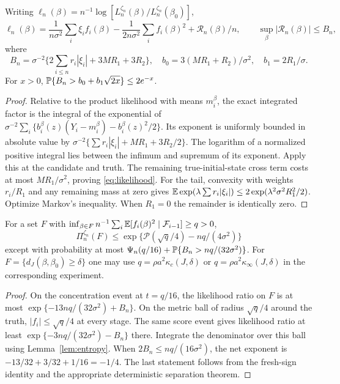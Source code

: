 \begin{lemma}
\label{lem:remainder}
Writing $\ell_n(\beta)=n^{-1}\log[L_n^{\zeta_n}(\beta)/L_n^{\zeta_n}(\beta_0)]$,
\begin{equation}
 \ell_n(\beta)=\frac1{n\sigma^2}\sum_i\xi_i f_i(\beta)
 -\frac1{2n\sigma^2}\sum_i f_i(\beta)^2+\mathcal R_n(\beta)/n,
 \qquad \sup_\beta|\mathcal R_n(\beta)|\le B_n,
 \label{eq:likelihood}
\end{equation}
where
\[
 B_n=\sigma^{-2}\{2\sum_{i\le n}r_i|\xi_i|+3MR_1+3R_2\},\quad
 b_0=3(MR_1+R_2)/\sigma^2,\quad b_1=2R_1/\sigma.
\]
For $x>0$, $\mathbb P\{B_n>b_0+b_1\sqrt{2x}\}\le2e^{-x}$.
\end{lemma}
\begin{proof}
Relative to the product likelihood with means $m_i^\beta$, the exact
integrated factor is the integral of the exponential of
$\sigma^{-2}\sum_i\{b_i^\beta(z)(Y_i-m_i^\beta)-b_i^\beta(z)^2/2\}$.
Its exponent is uniformly bounded in absolute value by
$\sigma^{-2}\{\sum r_i|\xi_i|+MR_1+3R_2/2\}$. The logarithm of a normalized
positive integral lies between the infimum and supremum of its exponent.
Apply this at the candidate and truth. The remaining true-initial-state cross
term costs at most $MR_1/\sigma^2$, proving \eqref{eq:likelihood}.
For the tail, convexity with weights $r_i/R_1$ and any remaining mass at zero
gives $\mathbb E\exp(\lambda\sum r_i|\xi_i|)\le
2\exp(\lambda^2\sigma^2R_1^2/2)$. Optimize Markov's inequality.
When $R_1=0$ the remainder is identically zero.
\end{proof}

\begin{theorem}
\label{thm:posterior}
For a set $F$ with
$\inf_{\beta\in F}n^{-1}\sum_i\mathbb E[f_i(\beta)^2\mid\mathcal F_{i-1}]\ge q>0$,
\begin{equation}
 \Pi_n^{\zeta_n}(F)\le
 \exp\{\mathcal P(\sqrt q/4)-nq/(4\sigma^2)\}
 \label{eq:posterior-bound}
\end{equation}
except with probability at most
$\Psi_n(q/16)+\mathbb P\{B_n>nq/(32\sigma^2)\}$.
For $F=\{d_J(\beta,\beta_0)\ge\delta\}$ one may use
$q=\rho a^2\kappa_c(J,\delta)$ or $q=\rho a^2\kappa_\infty(J,\delta)$
in the corresponding experiment.
\end{theorem}
\begin{proof}
On the concentration event at $t=q/16$, the likelihood ratio on $F$ is at most
$\exp\{-13nq/(32\sigma^2)+B_n\}$. On the metric ball of radius $\sqrt q/4$
around the truth, $|f_i|\le\sqrt q/4$ at every stage. The same score event
gives likelihood ratio at least $\exp\{-3nq/(32\sigma^2)-B_n\}$ there.
Integrate the denominator over this ball using Lemma~\ref{lem:entropy}.
When $2B_n\le nq/(16\sigma^2)$, the net exponent is
$-13/32+3/32+1/16=-1/4$. The last statement follows from the fresh-sign
identity and the appropriate deterministic separation theorem.
\end{proof}


